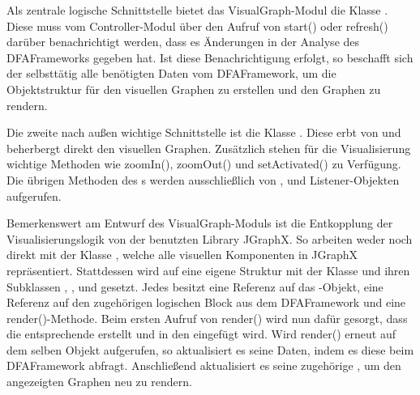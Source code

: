 Als zentrale logische Schnittstelle bietet das VisualGraph-Modul die Klasse . 
Diese muss vom Controller-Modul über den Aufruf von start() oder refresh() darüber benachrichtigt werden, dass es Änderungen in der Analyse des DFAFrameworks gegeben hat.
Ist diese Benachrichtigung erfolgt, so beschafft sich der  selbsttätig alle benötigten Daten vom DFAFramework, um die Objektstruktur für den visuellen Graphen zu erstellen und den Graphen zu rendern.

Die zweite nach außen wichtige Schnittstelle ist die Klasse . Diese erbt von  und beherbergt direkt den visuellen Graphen.
Zusätzlich stehen für die Visualisierung wichtige Methoden wie zoomIn(), zoomOut() und setActivated() zu Verfügung.
Die übrigen Methoden des s werden ausschließlich von ,  und Listener-Objekten aufgerufen.

Bemerkenswert am Entwurf des VisualGraph-Moduls ist die Entkopplung der Visualisierungslogik von der benutzten Library JGraphX.
So arbeiten weder  noch  direkt mit der Klasse , welche alle visuellen Komponenten in JGraphX repräsentiert.
Stattdessen wird auf eine eigene Struktur mit der Klasse  und ihren Subklassen , ,  und  gesetzt.
Jedes  besitzt eine Referenz auf das -Objekt, eine Referenz auf den zugehörigen logischen Block aus dem DFAFramework und eine render()-Methode.
Beim ersten Aufruf von render() wird nun dafür gesorgt, dass die entsprechende  erstellt und in den  eingefügt wird.
Wird render() erneut auf dem selben Objekt aufgerufen, so aktualisiert es seine Daten, indem es diese beim DFAFramework abfragt.
Anschließend aktualisiert es seine zugehörige , um den angezeigten Graphen neu zu rendern.

